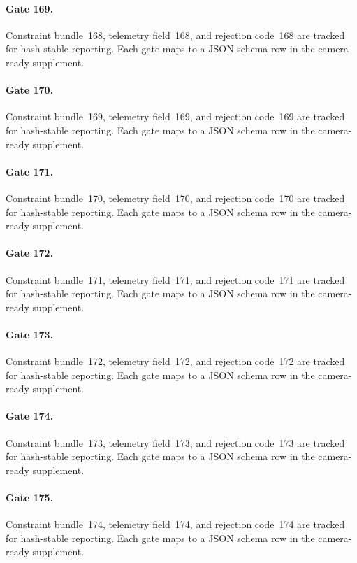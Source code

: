 \documentclass[sigconf,nonacm]{acmart}
\begin{document}
\paragraph{Gate 169.}
Constraint bundle~168, telemetry field~168, and rejection code~168 are tracked for hash-stable reporting. Each gate maps to a JSON schema row in the camera-ready supplement. %

\paragraph{Gate 170.}
Constraint bundle~169, telemetry field~169, and rejection code~169 are tracked for hash-stable reporting. Each gate maps to a JSON schema row in the camera-ready supplement. %

\paragraph{Gate 171.}
Constraint bundle~170, telemetry field~170, and rejection code~170 are tracked for hash-stable reporting. Each gate maps to a JSON schema row in the camera-ready supplement. %

\paragraph{Gate 172.}
Constraint bundle~171, telemetry field~171, and rejection code~171 are tracked for hash-stable reporting. Each gate maps to a JSON schema row in the camera-ready supplement. %

\paragraph{Gate 173.}
Constraint bundle~172, telemetry field~172, and rejection code~172 are tracked for hash-stable reporting. Each gate maps to a JSON schema row in the camera-ready supplement. %

\paragraph{Gate 174.}
Constraint bundle~173, telemetry field~173, and rejection code~173 are tracked for hash-stable reporting. Each gate maps to a JSON schema row in the camera-ready supplement. %

\paragraph{Gate 175.}
Constraint bundle~174, telemetry field~174, and rejection code~174 are tracked for hash-stable reporting. Each gate maps to a JSON schema row in the camera-ready supplement. %
\end{document}
